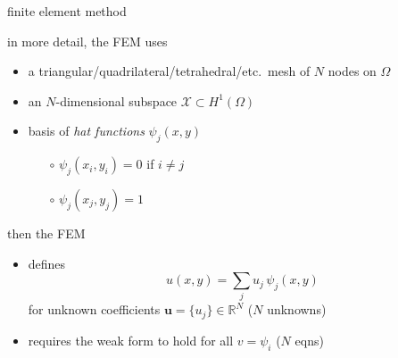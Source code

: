 \documentclass[hide notes,intlimits,usenames,dvipsnames]{beamer}
\newcommand{\RR}{\mathbb{R}}
\newcommand{\bu}{\mathbf{u}}
\begin{document}
\begin{frame}{finite element method}

in more detail, the FEM uses
\begin{itemize}
\item a {\footnotesize triangular/quadrilateral/tetrahedral/etc.}~mesh of $N$ nodes on $\Omega$
\item an $N$-dimensional subspace $\mathcal{X} \subset H^1(\Omega)$
\item \begin{minipage}[t]{55mm}
basis of \emph{hat functions} $\psi_j(x,y)$
	\begin{itemize}
	\item[$\circ$] $\psi_j(x_i,y_i)=0$ if $i\ne j$
	\item[$\circ$] $\psi_j(x_j,y_j)=1$
	\end{itemize}
\end{minipage}
\quad
\begin{minipage}[t]{35mm}
\vspace{-4mm}
\begin{tikzpicture}[scale=0.6, z={(.707,.3)}, baseline]

\end{tikzpicture}
\end{minipage}
\end{itemize}

\vspace{-3mm}
then the FEM
\begin{itemize}
\item defines
   $$u(x,y) = \sum_j u_{j}\, \psi_{j}(x,y)$$
for unknown coefficients $\bu=\{u_j\}\in \RR^N$ ($N$ unknowns)
\item requires the weak form to hold for all $v=\psi_i$ ($N$ eqns)
\end{itemize}
\end{frame}
\end{document}

